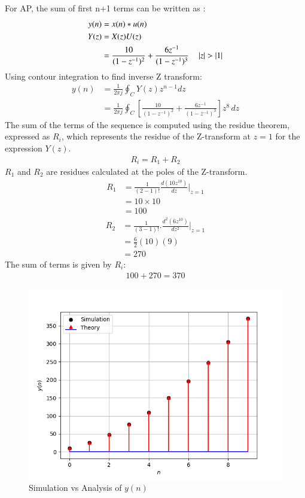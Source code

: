 \documentclass[journal,12pt,twocolumn]{IEEEtran}
\theoremstyle{remark}
\begin{document}
For AP, the sum of first n+1 terms can be written as :
\begin{align}
	 y(n)&=x(n)*u(n) \\
	 Y(z) &= X(z)U(z)\\
	&=\frac{10}{(1-z^{-1})^2} + \frac{6z^{-1}}{(1-z^{-1})^3}
	\quad \left\vert z\right\vert>\left\vert1\right\vert
\end{align}
Using contour integration to find inverse Z transform:
\begin{align}
	y(n) &= \frac{1}{2\pi j} \oint_C Y(z) z^{n-1} dz\\
	&= \frac{1}{2\pi j} \oint_C [ \frac{10}{(1-z^{-1})^2} + \frac{6z^{-1}}{(1-z^{-1})^3} ]z^{8} \, dz
\end{align}
The sum of the terms of the sequence is computed using the residue theorem, expressed as $R_i$, which represents the residue of the Z-transform at $ z=1 $ for the expression $ Y(z) $.
\begin{align}
	R_i=R_1 + R_2
\end{align}
 $R_1$ and $R_2$ are residues calculated at the poles of the Z-transform.
\begin{align}
		R_1 &= \frac{1}{{(2-1)!}}  \frac{d (10z^{10})}{dz} |_{z=1} \\
	&=10\times 10 \\
	&=100
\end{align}
\begin{align}
	R_2 &= \frac{1}{{(3-1)!}} . \frac{d^2(6z^{10})}{dz^2} |_{z=1} \\
	&= \frac{6}{2}(10)(9) \\
	&= 270
\end{align}
The sum of terms is given by $R_i$:
 \begin{align}
100 + 270 = 370
\end{align}
\begin{figure}[H]
    \centering
    \includegraphics[width=\columnwidth]{figs/fig2.png}
    \caption{Simulation vs Analysis of $y(n)$}
    \label{fig:11.9.5.8fig1}
\end{figure}
\end{document}
